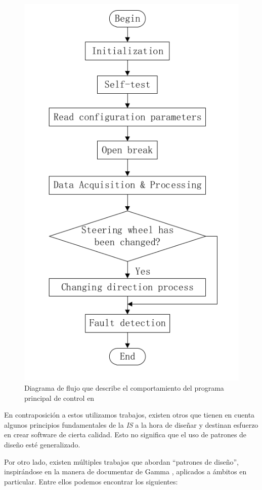 \begin{figure}[h]
	\label{fig:flujo}
	\centering
    \caption{Diagrama de flujo que describe el comportamiento del programa principal de control en \cite{bad-desing-auto}}
    \includegraphics[width=0.5\linewidth]{main_flujo.png}
\end{figure}

En contraposición a estos utilizamos trabajos, existen otros \cite{good-desing-agrobot,good-desing-street} que tienen en cuenta algunos principios fundamentales de la \textit{IS} a la hora de diseñar y destinan esfuerzo en crear software de cierta calidad. Esto no significa que el uso de patrones de diseño esté generalizado.

Por otro lado, existen múltiples trabajos que abordan ``patrones de diseño'',  inspirándose en la manera de documentar de Gamma \cite{Gamma:1995:DPE:186897}, aplicados a ámbitos en particular. Entre ellos podemos encontrar los siguientes:

